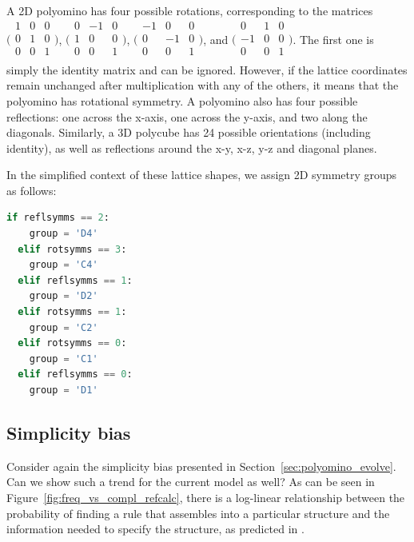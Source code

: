 A 2D polyomino has four possible rotations, corresponding to the matrices $\big(\begin{smallmatrix}
    1 & 0 & 0\\
    0 & 1 & 0\\
    0 & 0 & 1\\
\end{smallmatrix}\big)$, $\big(\begin{smallmatrix}
    0 & -1 & 0\\
    1 & 0 & 0\\
    0 & 0 & 1\\
\end{smallmatrix}\big)$, $\big(\begin{smallmatrix}
    -1 & 0 & 0\\
    0 & -1 & 0\\
    0 & 0 & 1\\
\end{smallmatrix}\big)$, and $\big(\begin{smallmatrix}
    0 & 1 & 0\\
    -1 & 0 & 0\\
    0 & 0 & 1\\
\end{smallmatrix}\big)$. The first one is simply the identity matrix and can be ignored. However, if the lattice coordinates remain unchanged after multiplication with any of the others, it means that the polyomino has rotational symmetry. A polyomino also has four possible reflections: one across the x-axis, one across the y-axis, and two along the diagonals. Similarly, a 3D polycube has 24 possible orientations (including identity), as well as reflections around the x-y, x-z, y-z and diagonal planes.

In the simplified context of these lattice shapes, we assign 2D symmetry groups as follows:
\begin{lstlisting}[language=Python]
  if reflsymms == 2:
    group = 'D4'
  elif rotsymms == 3:
    group = 'C4'
  elif reflsymms == 1:
    group = 'D2'
  elif rotsymms == 1:
    group = 'C2'
  elif rotsymms == 0:
    group = 'C1'
  elif reflsymms == 0:
    group = 'D1'
\end{lstlisting}

\subsection{Simplicity bias}

Consider again the simplicity bias presented in Section~\ref{sec:polyomino_evolve}. Can we show such a trend for the current model as well? As can be seen in Figure~\ref{fig:freq_vs_compl_refcalc}, there is a log-linear relationship between the probability of finding a rule that assembles into a particular structure and the information needed to specify the structure, as predicted in \cite{dingle2018input, dingle2020generic}.

